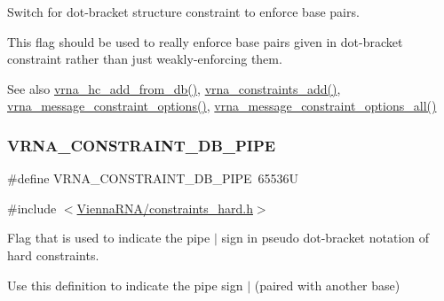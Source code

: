 Switch for dot-\/bracket structure constraint to enforce base pairs. 

This flag should be used to really enforce base pairs given in dot-\/bracket constraint rather than just weakly-\/enforcing them.

\begin{DoxySeeAlso}{See also}
\hyperlink{group__hard__constraints_ga5b4de3247b67358080c176b94591a8e6}{vrna\+\_\+hc\+\_\+add\+\_\+from\+\_\+db()}, \hyperlink{group__constraints_ga35a401f680969a556858a8dd5f1d07cc}{vrna\+\_\+constraints\+\_\+add()}, \hyperlink{group__constraints_gaa1f20b53bf09ac2e6b0dbb13f7d89670}{vrna\+\_\+message\+\_\+constraint\+\_\+options()}, \hyperlink{group__constraints_gaec7e13fa0465c2acc7a621d1aecb709f}{vrna\+\_\+message\+\_\+constraint\+\_\+options\+\_\+all()} 
\end{DoxySeeAlso}
\mbox{\label{group__hard__constraints_ga13053547a2de5532b64b64d35e097ae1}} 
\subsubsection{\texorpdfstring{V\+R\+N\+A\+\_\+\+C\+O\+N\+S\+T\+R\+A\+I\+N\+T\+\_\+\+D\+B\+\_\+\+P\+I\+PE}{VRNA\_CONSTRAINT\_DB\_PIPE}}
{\footnotesize\ttfamily \#define V\+R\+N\+A\+\_\+\+C\+O\+N\+S\+T\+R\+A\+I\+N\+T\+\_\+\+D\+B\+\_\+\+P\+I\+PE~65536U}



{\ttfamily \#include $<$\hyperlink{constraints__hard_8h}{Vienna\+R\+N\+A/constraints\+\_\+hard.\+h}$>$}



Flag that is used to indicate the pipe \textquotesingle{}$\vert$\textquotesingle{} sign in pseudo dot-\/bracket notation of hard constraints. 

Use this definition to indicate the pipe sign \textquotesingle{}$\vert$\textquotesingle{} (paired with another base)

